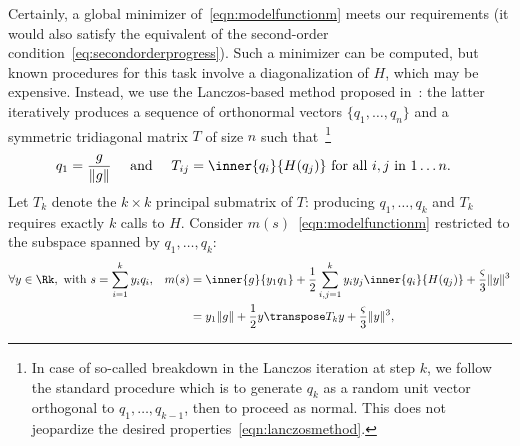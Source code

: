 Certainly, a global minimizer of~\eqref{eqn:modelfunctionm} meets our requirements (it would also satisfy the equivalent of the second-order condition~\eqref{eq:secondorderprogress}). Such a minimizer can be computed, but known procedures for this task involve a diagonalization of $H$, which may be expensive. Instead, we use the Lanczos-based method proposed in~\citep[\S6]{cartis2011adaptivecubicPartI}: %
the latter iteratively produces a sequence of orthonormal vectors $\{q_1, \ldots, q_n\}$ and a symmetric tridiagonal matrix $T$ of size $n$ such that~\citep[Lec.~36]{trefethen1997numerical}\footnote{In case of so-called breakdown in the Lanczos iteration at step $k$, we follow the standard procedure which is to generate $q_k$ as a random unit vector orthogonal to $q_1, \ldots, q_{k-1}$, then to proceed as normal. This does not jeopardize the desired properties~\eqref{eqn:lanczosmethod}.\label{footnotelanczos}}
\begin{align}
	q_1 & = \frac{g}{\|g\|} &  \textrm{ and } & & T_{ij} & = \inner{q_i}{H(q_j)} \textrm{ for all } i,j \textrm{ in } 1\ldots n.
	\label{eqn:lanczosmethod}
\end{align}
Let $T_k$ denote the $k \times k$ principal submatrix of $T$: producing $q_1, \ldots, q_k$ and $T_k$ requires exactly $k$ calls to $H$.
%
%
Consider $m(s)$~\eqref{eqn:modelfunctionm} restricted to the subspace spanned by $q_1, \ldots, q_k$:
\begin{align}
	\forall y \in \Rk, \textrm{ with } s & = \sum_{i = 1}^{k} y_i q_i, &   m(s) & = \inner{g}{y_1q_1} + \frac{1}{2} \sum_{i,j=1}^k y_i y_j \inner{q_i}{H(q_j)} + \frac{\varsigma}{3} \|y\|^3 \nonumber\\
		 & & & = y_1 \|g\| + \frac{1}{2} y\transpose T_ky + \frac{\varsigma}{3} \|y\|^3,
		 \label{eq:modelrestrictedlanczos}
\end{align}
